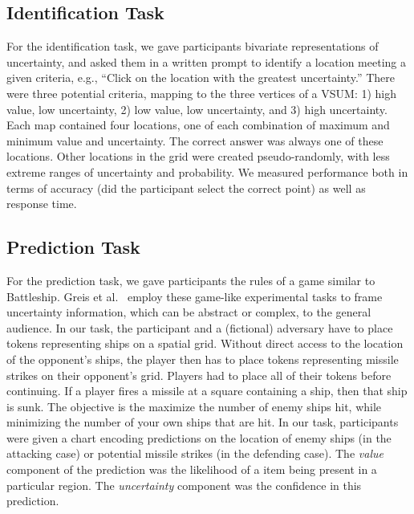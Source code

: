 \documentclass{vgtc}                          %
\begin{document}
\subsection{Identification Task}

For the identification task, we gave participants bivariate representations of uncertainty, and asked them in a written prompt to identify a location meeting a given criteria, e.g., ``Click on the location with the greatest uncertainty.'' There were three potential criteria, mapping to the three vertices of a VSUM: 1) high value, low uncertainty, 2) low value, low uncertainty, and 3) high uncertainty. Each map contained four locations, one of each combination of maximum and minimum value and uncertainty. The correct answer was always one of these locations. Other locations in the grid were created pseudo-randomly, with less extreme ranges of uncertainty and probability. We measured performance both in terms of accuracy (did the participant select the correct point) as well as response time.

\subsection{Prediction Task}

\taskTwoFig

For the prediction task, we gave participants the rules of a game similar to Battleship. Greis et al.~\cite{greis2016decision} employ these game-like experimental tasks to frame uncertainty information, which can be abstract or complex, to the general audience. In our task, the participant and a (fictional) adversary have to place tokens representing ships on a spatial grid. Without direct access to the location of the opponent's ships, the player then has to place tokens representing missile strikes on their opponent's grid. Players had to place all of their tokens before continuing. If a player fires a missile at a square containing a ship, then that ship is sunk. The objective is the maximize the number of enemy ships hit, while minimizing the number of your own ships that are hit. In our task, participants were given a chart encoding predictions on the location of enemy ships (in the attacking case) or potential missile strikes (in the defending case). The \emph{value} component of the prediction was the likelihood of a item being present in a particular region. The \emph{uncertainty} component was the confidence in this prediction.
\end{document}
